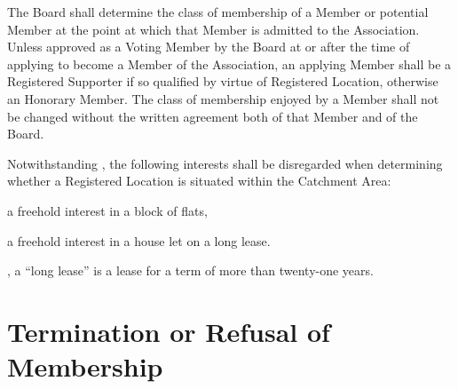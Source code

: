\documentclass[10pt]{mk-articles-of-association}
\newcommand{\EC}[0]{Board}
\newcommand{\Exec}[0]{\EC{} }
\begin{document}
\begin{constenum}
  \item The \Exec shall determine the class of membership of a Member
    or potential Member at the point at which that Member is admitted
    to the Association. Unless approved as a Voting Member by the
    \Exec at or after the time of applying to become a Member of the
    Association, an applying Member shall be a Registered Supporter if
    so qualified by virtue of Registered Location, otherwise an
    Honorary Member.  The class of membership enjoyed by a Member
    shall not be changed without the written agreement both of that
    Member and of the \EC{}.

  \item Notwithstanding , the following interests
    shall be disregarded when determining whether a Registered Location
    is situated within the Catchment Area:
    \begin{constenum}
      \item a freehold interest in a block of flats, \ITor
      \item a freehold interest in a house let on a long lease.
    \end{constenum}

    \avoiddoubt, a ``long lease'' is a lease for a term of more than
    twenty-one years.


\end{constenum}



\section{Termination or Refusal of Membership}
\end{document}
